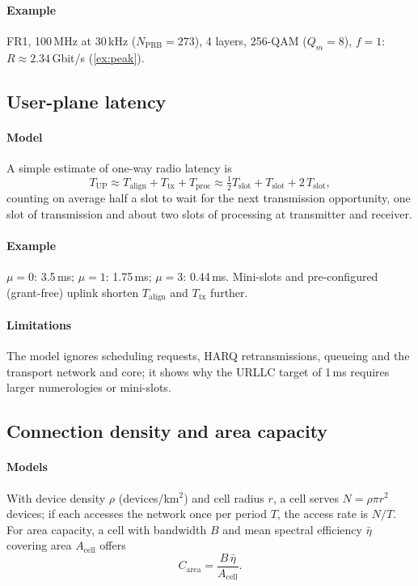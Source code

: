 \documentclass[11pt,a4paper]{article}
\begin{document}
\paragraph{Example} FR1, 100\,MHz at 30\,kHz ($N_{\mathrm{PRB}} = 273$), 4 layers, 256-QAM ($Q_m = 8$), $f = 1$:
$R \approx 2.34$\,Gbit/s (\cref{ex:peak}).

\subsection{User-plane latency}\label{sec:lat}
\paragraph{Model} A simple estimate of one-way radio latency is
\begin{equation}\label{eq:latency}
  T_{\mathrm{UP}} \approx T_{\mathrm{align}} + T_{\mathrm{tx}} + T_{\mathrm{proc}}
  \approx \tfrac12 T_{\mathrm{slot}} + T_{\mathrm{slot}} + 2\,T_{\mathrm{slot}},
\end{equation}
counting on average half a slot to wait for the next transmission opportunity, one slot of transmission and
about two slots of processing at transmitter and receiver.
\paragraph{Example} $\mu = 0$: 3.5\,ms; $\mu = 1$: 1.75\,ms; $\mu = 3$: 0.44\,ms. Mini-slots and pre-configured
(grant-free) uplink shorten $T_{\mathrm{align}}$ and $T_{\mathrm{tx}}$ further.
\paragraph{Limitations} The model ignores scheduling requests, HARQ retransmissions, queueing and the transport
network and core; it shows why the URLLC target of 1\,ms requires larger numerologies or mini-slots.

\subsection{Connection density and area capacity}\label{sec:density}
\paragraph{Models} With device density $\rho$ (devices/km$^2$) and cell radius $r$, a cell serves
$N = \rho\pi r^2$ devices; if each accesses the network once per period $T$, the access rate is $N/T$. For area
capacity, a cell with bandwidth $B$ and mean spectral efficiency $\bar\eta$ covering area $A_{\mathrm{cell}}$ offers
\begin{equation}\label{eq:area}
  C_{\mathrm{area}} = \frac{B\,\bar\eta}{A_{\mathrm{cell}}}.
\end{equation}
\end{document}
